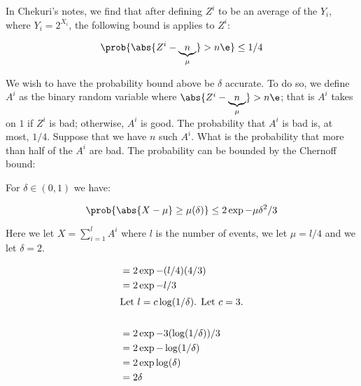 \documentclass[../main.tex]{subfiles}
\begin{document}
\begin{example}
    In Chekuri's notes, we find that after defining $Z^{i}$ to be an average of the $Y_{i}$, where $Y_{i} = 2^{X_{i}}$, the following bound is applies to $Z^{i}$:

    \[
        \prob{\abs{Z^{i} - \underbrace{n}_{\mu}} > n\e} \leq 1/4
    \]

    We wish to have the probability bound above be $\delta$ accurate. To do so, we define $A^{i}$ as the binary random variable where $\abs{Z^{i} - \underbrace{n}_{\mu}} > n\e$; that is $A^{i}$ takes on $1$ if $Z^{i}$ is bad; otherwise, $A^{i}$ is good. The probability that $A^{i}$ is bad is, at most, $1/4$. Suppose that we have $n$ such $A^{i}$. What is the probability that more than half of the $A^{i}$ are bad. The probability can be bounded by the Chernoff bound:

    For $\delta \in (0,1)$ we have:

    \[
        \prob{\abs{X - \mu} \geq \mu(\delta)} \leq 2\exp{-\mu \delta^2 /3}
    \]

    Here we let $X = \sum_{i=1}^{l}A^{i}$ where $l$ is the number of events, we let $\mu = l/4$ and we let $\delta = 2$.

    \begin{align*}
        &= 2\exp{-(l/4)(4/3)} \\
        &= 2\exp{-l/3} \\
        \intertext{Let $l = c \log(1/\delta)$. Let $c = 3$.} \\
        &= 2\exp{-3(\log(1/\delta))/3} \\
        &= 2\exp{-\log(1/\delta)} \\
        &= 2\exp{\log(\delta)} \\
        &= 2\delta
    \end{align*}
\end{example}
\end{document}

